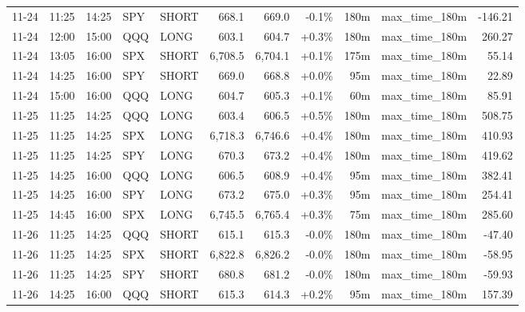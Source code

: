 \documentclass[11pt,a4paper,twoside]{article}
\begin{document}
\begin{center}
\begin{longtable}{>{\color{txtmain}}l l l l l r r r r >{\color{txtmain}}l r}
11-24 & 11:25 & 14:25 & SPY & SHORT & 668.1 & 669.0 & \textcolor{lossred}{-0.1\%} & 180m & max\_time\_180m & \textcolor{lossred}{-146.21} \\
11-24 & 12:00 & 15:00 & QQQ & LONG & 603.1 & 604.7 & \textcolor{wingreen}{+0.3\%} & 180m & max\_time\_180m & \textcolor{wingreen}{260.27} \\
11-24 & 13:05 & 16:00 & SPX & SHORT & 6,708.5 & 6,704.1 & \textcolor{wingreen}{+0.1\%} & 175m & max\_time\_180m & \textcolor{wingreen}{55.14} \\
11-24 & 14:25 & 16:00 & SPY & SHORT & 669.0 & 668.8 & \textcolor{wingreen}{+0.0\%} & 95m & max\_time\_180m & \textcolor{wingreen}{22.89} \\
11-24 & 15:00 & 16:00 & QQQ & LONG & 604.7 & 605.3 & \textcolor{wingreen}{+0.1\%} & 60m & max\_time\_180m & \textcolor{wingreen}{85.91} \\
11-25 & 11:25 & 14:25 & QQQ & LONG & 603.4 & 606.5 & \textcolor{wingreen}{+0.5\%} & 180m & max\_time\_180m & \textcolor{wingreen}{508.75} \\
11-25 & 11:25 & 14:25 & SPX & LONG & 6,718.3 & 6,746.6 & \textcolor{wingreen}{+0.4\%} & 180m & max\_time\_180m & \textcolor{wingreen}{410.93} \\
11-25 & 11:25 & 14:25 & SPY & LONG & 670.3 & 673.2 & \textcolor{wingreen}{+0.4\%} & 180m & max\_time\_180m & \textcolor{wingreen}{419.62} \\
11-25 & 14:25 & 16:00 & QQQ & LONG & 606.5 & 608.9 & \textcolor{wingreen}{+0.4\%} & 95m & max\_time\_180m & \textcolor{wingreen}{382.41} \\
11-25 & 14:25 & 16:00 & SPY & LONG & 673.2 & 675.0 & \textcolor{wingreen}{+0.3\%} & 95m & max\_time\_180m & \textcolor{wingreen}{254.41} \\
11-25 & 14:45 & 16:00 & SPX & LONG & 6,745.5 & 6,765.4 & \textcolor{wingreen}{+0.3\%} & 75m & max\_time\_180m & \textcolor{wingreen}{285.60} \\
11-26 & 11:25 & 14:25 & QQQ & SHORT & 615.1 & 615.3 & \textcolor{lossred}{-0.0\%} & 180m & max\_time\_180m & \textcolor{lossred}{-47.40} \\
11-26 & 11:25 & 14:25 & SPX & SHORT & 6,822.8 & 6,826.2 & \textcolor{lossred}{-0.0\%} & 180m & max\_time\_180m & \textcolor{lossred}{-58.95} \\
11-26 & 11:25 & 14:25 & SPY & SHORT & 680.8 & 681.2 & \textcolor{lossred}{-0.0\%} & 180m & max\_time\_180m & \textcolor{lossred}{-59.93} \\
11-26 & 14:25 & 16:00 & QQQ & SHORT & 615.3 & 614.3 & \textcolor{wingreen}{+0.2\%} & 95m & max\_time\_180m & \textcolor{wingreen}{157.39} \\

\end{longtable}
\end{center}
\end{document}
